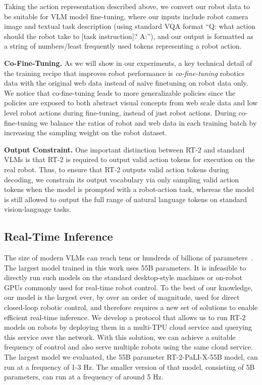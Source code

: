 \documentclass[11pt, a4paper, logo, copyright]{deepmind}
\newcommand{\methodname}{RT-2\xspace}
\begin{document}
Taking the action representation described above, we convert our robot data to be suitable for VLM model fine-tuning, where our inputs include robot camera image and textual task description (using standard VQA format ``Q: what action should the robot take to [task instruction]? A:''), and our output is formatted as a string of numbers/least frequently used tokens representing a robot action.

\textbf{Co-Fine-Tuning.} As we will show in our experiments, a key technical detail of the training recipe that improves robot performance is \textit{co-fine-tuning} robotics data with the original web data instead of na\"ive finetuning on robot data only. 
We notice that co-fine-tuning leads to more generalizable policies since the policies are exposed to both abstract visual concepts from web scale data and low level robot actions during fine-tuning, instead of just robot actions.
During co-fine-tuning we balance the ratios of robot and web data in each training batch by increasing the sampling weight on the robot dataset. 


\textbf{Output Constraint.} One important distinction between \methodname and standard VLMs is that \methodname is required to output valid action tokens for execution on the real robot. 
Thus, to ensure that \methodname outputs valid action tokens during decoding, we constrain its output vocabulary via only sampling valid action tokens when the model is prompted with a robot-action task, whereas the model is still allowed to output the full range of natural language tokens on standard vision-language tasks. 






\subsection{Real-Time Inference}

The size of modern VLMs can reach tens or hundreds of billions of parameters~\citep{chen2023palix,driess2023palm}. The largest model trained in this work uses 55B parameters. It is infeasible to directly run such models on the standard desktop-style machines or on-robot GPUs commonly used for real-time robot control. To the best of our knowledge, our model is the largest ever, by over an order of magnitude, used for direct closed-loop robotic control, and therefore requires a new set of solutions to enable efficient real-time inference. We develop a protocol that allows us to run \methodname models on robots by deploying them in a multi-TPU cloud service and querying this service over the network. With this solution, we can achieve a suitable frequency of control and also serve multiple robots using the same cloud service. The largest model we evaluated, the 55B parameter \methodname-PaLI-X-55B model, can run at a frequency of 1-3 Hz. The smaller version of that model, consisting of 5B parameters, can run at a frequency of around 5 Hz. 
\end{document}
